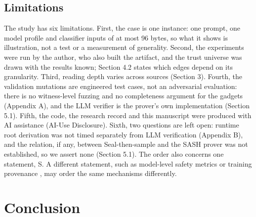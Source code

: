 \documentclass[11pt]{article}
\begin{document}
\subsection{Limitations}

The study has six limitations. First, the case is one instance: one prompt, one model profile and classifier inputs of at most 96 bytes, so what it shows is illustration, not a test or a measurement of generality. Second, the experiments were run by the author, who also built the artifact, and the trust universe was drawn with the results known; Section 4.2 states which edges depend on its granularity. Third, reading depth varies across sources (Section 3). Fourth, the validation mutations are engineered test cases, not an adversarial evaluation: there is no witness-level fuzzing and no completeness argument for the gadgets (Appendix A), and the LLM verifier is the prover's own implementation (Section 5.1). Fifth, the code, the research record and this manuscript were produced with AI assistance (AI-Use Disclosure). Sixth, two questions are left open: runtime root derivation was not timed separately from LLM verification (Appendix B), and the relation, if any, between Seal-then-sample \cite{A22} and the SASH prover was not established, so we assert none (Section 5.1). The order also concerns one statement, S. A different statement, such as model-level safety metrics \cite{A9} or training provenance \cite{D19}, may order the same mechanisms differently.

\section{Conclusion}
\end{document}

